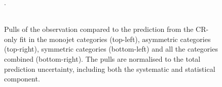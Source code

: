 \clearpage
  \begin{center}
    \begin{figure}[h!]
      \caption{Pulls of the observation compared to the prediction from the CR-only fit in the monojet categories (top-left), 
        asymmetric categories (top-right), symmetric categories (bottom-left) and all the categories combined (bottom-right). 
        The pulls are normalised to the total prediction uncertainty, including both the systematic and statistical component. \label{fig:pulls1D}}.
       \\
       \\
    \end{figure}
  \end{center}



